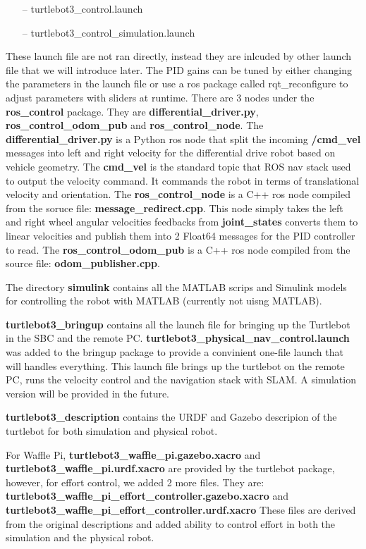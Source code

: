 \documentclass[12]{article}
\begin{document}
\begin{itemize}
	\item[--] turtlebot3\_control.launch
	\item[--] turtlebot3\_control\_simulation.launch
\end{itemize}  
These launch file are not ran directly, instead they are inlcuded by other launch file that we will introduce later.
The PID gains can be tuned by either changing the parameters in the launch file or use a ros package called rqt\_reconfigure to adjust parameters with sliders at runtime. 
There are 3 nodes under the \textbf{ros\_control} package. They are \textbf{differential\_driver.py}, \textbf{ros\_control\_odom\_pub} and \textbf{ros\_control\_node}. 
The \textbf{differential\_driver.py} is a Python ros node that split the incoming \textbf{\//cmd\_vel} messages into left and right velocity for the differential drive robot based on vehicle geometry. 
The \textbf{\/cmd\_vel} is the standard topic that ROS nav stack used to output the velocity command. It commands the robot in terms of translational velocity and orientation. 
The \textbf{ros\_control\_node} is a C++ ros node compiled from the soruce file: \textbf{message\_redirect.cpp}. 
This node simply takes the left and right wheel angular velocities feedbacks from \textbf{\/joint\_states} converts them to linear velocities and publish them into 2 Float64 messages for the PID controller to read.
The \textbf{ros\_control\_odom\_pub} is a C++ ros node compiled from the source file: \textbf{odom\_publisher.cpp}.

The directory \textbf{simulink} contains all the MATLAB scrips and Simulink models for controlling the robot with MATLAB (currently not uisng MATLAB). 

\textbf{turtlebot3\_bringup} contains all the launch file for bringing up the Turtlebot in the SBC and the remote PC. 
\textbf{turtlebot3\_physical\_nav\_control.launch} was added to the bringup package to provide a convinient one-file launch that will handles everything. 
This launch file brings up the turtlebot on the remote PC, runs the velocity control and the navigation stack with SLAM. A simulation version will be provided in the future.

\textbf{turtlebot3\_description} contains the URDF and Gazebo descripion of the turtlebot for both simulation and physical robot. 

For Waffle Pi, \textbf{turtlebot3\_waffle\_pi.gazebo.xacro}
and \textbf{turtlebot3\_waffle\_pi.urdf.xacro}
are provided by the turtlebot package, however, for effort control, we added 2 more files. 
They are: \\
\textbf{turtlebot3\_waffle\_pi\_effort\_controller.gazebo.xacro}
and \textbf{turtlebot3\_waffle\_pi\_effort\_controller.urdf.xacro}
These files are derived from the original descriptions and added ability to control effort in both the simulation and the physical robot. 
\end{document}
